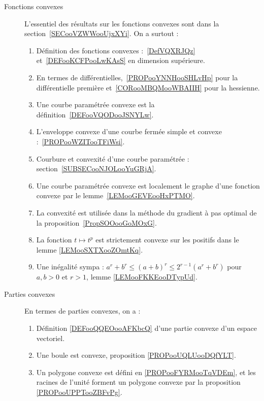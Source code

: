 	\label{THEMEooConvexite}
\begin{description}
	\item[Fonctions convexes]
		L'essentiel des résultats sur les fonctions convexes sont dans la section~\ref{SECooVZWWooUjxXYi}. On a surtout :
		\begin{enumerate}
			\item
			      Définition des fonctions convexes :~\ref{DefVQXRJQz} et~\ref{DEFooKCFPooLwKAsS} en dimension supérieure.
			\item
			      En termes de différentielles,~\ref{PROPooYNNHooSHLvHp} pour la différentielle première et~\ref{CORooMBQMooWBAIIH} pour la hessienne.
			\item
			      Une courbe paramétrée convexe est la définition~\ref{DEFooVQODooJSNYLw}.
			\item
			      L'enveloppe convexe d'une courbe fermée simple et convexe :~\ref{PROPooWZITooTFiWsi}.
			\item
			      Courbure et convexité d'une courbe paramétrée : section~\ref{SUBSECooNJOLooYuGRjA}.
			\item
			      Une courbe paramétrée convexe est localement le graphe d'une fonction convexe par le lemme~\ref{LEMooGEVEooHxPTMO}.
			\item
			      La convexité est utilisée dans la méthode du gradient à pas optimal de la proposition~\ref{PropSOOooGoMOxG}.
			\item
			      La fonction \( t\mapsto t^p\) est strictement convexe sur les positifs dans le lemme \ref{LEMooSXTXooZOmtKq}.
			\item
			      Une inégalité sympa : $a^r+b^r\leq (a+b)^r\leq 2^{r-1}(a^r+b^r)$ pour \( a,b>0\) et \( r>1\), lemme \ref{LEMooFKKEooDTypUd}.
		\end{enumerate}
	\item[Parties convexes]

		En termes de parties convexes, on a :
		\begin{enumerate}
			\item
			      Définition \ref{DEFooQQEOooAFKbcQ} d'une partie convexe d'un espace vectoriel.
			\item
			      Une boule est convexe, proposition \ref{PROPooUQLUooDQfYLT}.
			\item
			      Un polygone convexe est défini en \ref{PROPooFYRMooTqVDEm}, et les racines de l'unité forment un polygone convexe par la proposition \ref{PROPooUPPTooZBFvPg}.
		\end{enumerate}
\end{description}
